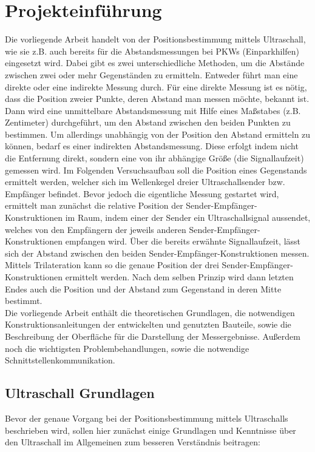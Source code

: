 
\chapter{Projekteinführung}
Die vorliegende Arbeit handelt von der Positionsbestimmung mittels Ultraschall, wie sie z.B. auch bereits für die Abstandsmessungen bei PKWs (Einparkhilfen) eingesetzt wird. Dabei gibt es zwei unterschiedliche Methoden, um die Abstände zwischen zwei oder mehr Gegenständen zu ermitteln. Entweder führt man eine direkte oder eine indirekte Messung durch. Für eine direkte Messung ist es nötig, dass die Position zweier Punkte, deren Abstand man messen möchte, bekannt ist. Dann wird eine unmittelbare Abstandsmessung mit Hilfe eines Maßstabes (z.B. Zentimeter) durchgeführt, um den Abstand zwischen den beiden Punkten zu bestimmen. Um allerdings unabhängig von der Position den Abstand ermitteln zu können, bedarf es einer indirekten Abstandsmessung. Diese erfolgt indem nicht die Entfernung direkt, sondern eine von ihr abhängige Größe (die Signallaufzeit) gemessen wird. Im Folgenden Versuchsaufbau soll die Position eines Gegenstands ermittelt werden, welcher sich im Wellenkegel dreier Ultraschallsender bzw. Empfänger befindet. Bevor jedoch die eigentliche Messung gestartet wird, ermittelt man zunächst die relative Position der Sender-Empfänger-Konstruktionen im Raum, indem einer der Sender ein Ultraschallsignal aussendet, welches von den Empfängern der  jeweils anderen Sender-Empfänger-Konstruktionen empfangen wird. Über die bereits erwähnte Signallaufzeit, lässt sich der Abstand zwischen den beiden Sender-Empfänger-Konstruktionen messen. Mittels Trilateration kann so die genaue Position der drei Sender-Empfänger-Konstruktionen ermittelt werden. Nach dem selben Prinzip wird dann letzten Endes auch die Position und der Abstand zum Gegenstand in deren Mitte bestimmt.\\
Die vorliegende Arbeit enthält die theoretischen Grundlagen, die notwendigen Konstruktionsanleitungen der entwickelten und genutzten Bauteile, sowie die Beschreibung der Oberfläche für die Darstellung der Messergebnisse. Außerdem noch die wichtigsten Problembehandlungen, sowie die notwendige Schnittstellenkommunikation.


\section{Ultraschall Grundlagen}
Bevor der genaue Vorgang bei der Positionsbestimmung mittels Ultraschalls beschrieben wird, sollen hier zunächst einige Grundlagen und Kenntnisse über den Ultraschall im Allgemeinen zum besseren Verständnis beitragen:
